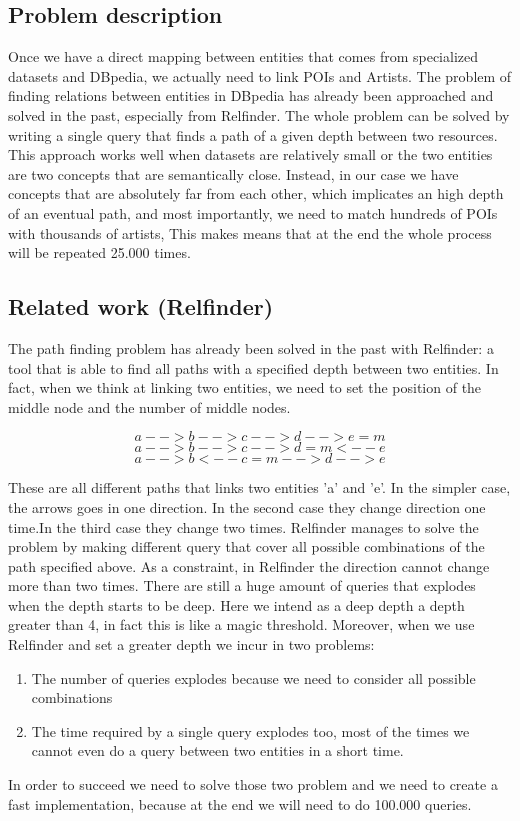 \documentclass[paper=a4, fontsize=11pt]{scrartcl}
\begin{document}
\subsection{Problem description}
Once we have a direct mapping between entities that comes from specialized datasets and DBpedia, we actually need to link POIs and Artists.
The problem of finding relations between entities in DBpedia has already been approached and solved in the past, especially from Relfinder. The whole problem can be solved by writing a single query that finds a path of a given depth between two resources. This approach works well when datasets are relatively small or the two entities are two concepts that are semantically close. Instead, in our case we have concepts that are absolutely far from each other, which implicates an high depth of an eventual path, and most importantly, we need to match hundreds of POIs with thousands of artists, This makes means that at the end the whole process will be repeated 25.000 times.
\subsection{Related work (Relfinder)}
The path finding problem has already been solved in the past with Relfinder: a tool that is able to find all paths with a specified depth between two entities. 
In fact, when we think at linking two entities, we need to set the position of the middle node and the number of middle nodes.

$$a-->b-->c-->d-->e=m$$
$$a-->b-->c-->d=m<--e$$
$$a-->b<--c=m-->d-->e$$

These are all different paths that links two entities 'a' and 'e'. In the simpler case, the arrows goes in one direction. In the second case they change direction one time.In the third case they change two times.
Relfinder manages to solve the problem by making different query that cover all possible combinations of the path specified above. As a constraint, in Relfinder the direction cannot change more than two times. There are still a huge amount of queries that explodes when the depth starts to be deep.
Here we intend as a deep depth a depth greater than 4, in fact this is like a magic threshold. 
Moreover, when we use Relfinder and set a greater depth we incur in two problems: 
\begin{enumerate}
\item The number of queries explodes because we need to consider all possible combinations
\item The time required by a single query explodes too, most of the times we cannot even do a query between two entities in a short time.
\end{enumerate}
In order to succeed we need to solve those two problem and we need to create a fast implementation, because at the end we will need to do 100.000 queries. 
\end{document}

